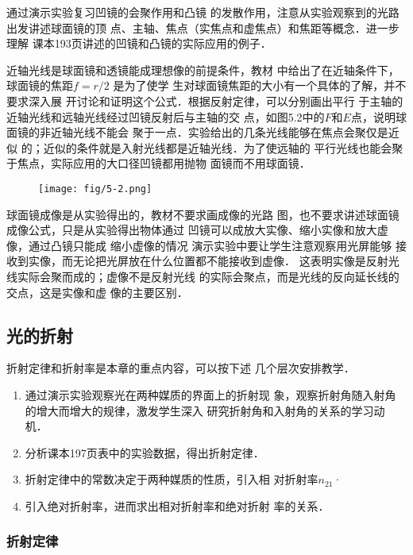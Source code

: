 通过演示实验复习凹镜的会聚作用和凸镜
的发散作用，注意从实验观察到的光路出发讲述球面镜的顶
点、主轴、焦点（实焦点和虚焦点）和焦距等概念．进一步理解
课本193页讲述的凹镜和凸镜的实际应用的例子．

近轴光线是球面镜和透镜能成理想像的前提条件，教材
中给出了在近轴条件下，球面镜的焦距$f=r/2$
是为了使学
生对球面镜焦距的大小有一个具体的了解，并不要求深入展
开讨论和证明这个公式．根据反射定律，可以分别画出平行
于主轴的近轴光线和远轴光线经过凹镜反射后与主轴的交
点，如图5.2中的$F$和$E$点，说明球面镜的非近轴光线不能会
聚于一点．实验给出的几条光线能够在焦点会聚仅是近似
的；近似的条件就是入射光线都是近轴光线．为了使远轴的
平行光线也能会聚于焦点，实际应用的大口径凹镜都用抛物
面镜而不用球面镜．
\begin{figure}[htp]
    \centering
    \texttt{[image: fig/5-2.png]}
    \caption{}
\end{figure}

球面镜成像是从实验得出的，教材不要求画成像的光路
图，也不要求讲述球面镜成像公式，只是从实验得出物体通过
凹镜可以成放大实像、缩小实像和放大虚像，通过凸镜只能成
缩小虚像的情况 演示实验中要让学生注意观察用光屏能够
接收到实像，而无论把光屏放在什么位置都不能接收到虚像．
这表明实像是反射光线实际会聚而成的；虚像不是反射光线
的实际会聚点，而是光线的反向延长线的交点，这是实像和虚
像的主要区别．


\subsection{光的折射}

折射定律和折射率是本章的重点内容，可以按下述
几个层次安排教学．
\begin{enumerate}
\item 通过演示实验观察光在两种媒质的界面上的折射现
象，观察折射角随入射角的增大而增大的规律，激发学生深入
研究折射角和入射角的关系的学习动机．
\item 分析课本197页表中的实验数据，得出折射定律．
\item 折射定律中的常数决定于两种媒质的性质，引入相
对折射率$n_{21}$·
\item 引入绝对折射率，进而求出相对折射率和绝对折射
率的关系．
\end{enumerate}

\subsubsection{折射定律}

